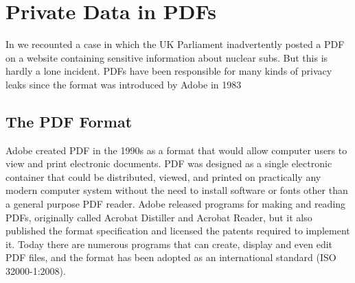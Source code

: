 \chapter{Private Data in PDFs}

In  we recounted a case in which the UK
Parliament inadvertently posted a PDF on a website containing
sensitive information about nuclear subs. But this is hardly a lone
incident. PDFs have been responsible for many kinds of privacy leaks
since the format was introduced by Adobe in 1983

\section{The PDF Format}

Adobe created PDF in the 1990s as a format that would allow computer
users to view and print electronic documents. PDF was designed as a
single electronic container that could be distributed, viewed, and
printed on practically any modern computer system without the need to
install  software or fonts other than a general purpose PDF
reader. Adobe released programs for making and reading PDFs,
originally called Acrobat Distiller and Acrobat Reader, but it also
published the format specification and licensed the patents required
to implement it. Today there are numerous programs that can create,
display and even edit PDF files, and the format has been adopted as an
international standard (ISO 32000-1:2008)\cite{ISO32000-1:2008}.

